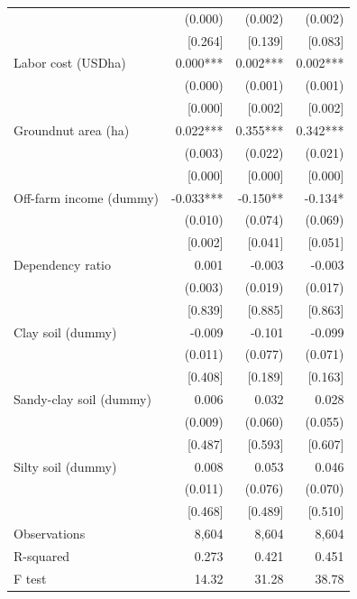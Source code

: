 \documentclass[
]{article}
\begin{document}
\begin{ThreePartTable}
\begin{longtable}[t]{lrrr}
 & (0.000) & (0.002) & (0.002)\\
 & {}[0.264] & {}[0.139] & {}[0.083]\\
Labor cost (USD\/ha) & 0.000*** & 0.002*** & 0.002***\\
 & (0.000) & (0.001) & (0.001)\\
 & {}[0.000] & {}[0.002] & {}[0.002]\\
Groundnut area (ha) & 0.022*** & 0.355*** & 0.342***\\
 & (0.003) & (0.022) & (0.021)\\
 & {}[0.000] & {}[0.000] & {}[0.000]\\
Off-farm income (dummy) & -0.033*** & -0.150** & -0.134*\\
 & (0.010) & (0.074) & (0.069)\\
 & {}[0.002] & {}[0.041] & {}[0.051]\\
Dependency ratio & 0.001 & -0.003 & -0.003\\
 & (0.003) & (0.019) & (0.017)\\
 & {}[0.839] & {}[0.885] & {}[0.863]\\
Clay soil (dummy) & -0.009 & -0.101 & -0.099\\
 & (0.011) & (0.077) & (0.071)\\
 & {}[0.408] & {}[0.189] & {}[0.163]\\
Sandy-clay soil (dummy) & 0.006 & 0.032 & 0.028\\
 & (0.009) & (0.060) & (0.055)\\
 & {}[0.487] & {}[0.593] & {}[0.607]\\
Silty soil (dummy) & 0.008 & 0.053 & 0.046\\
 & (0.011) & (0.076) & (0.070)\\
 & {}[0.468] & {}[0.489] & {}[0.510]\\
Observations & 8,604 & 8,604 & 8,604\\
R-squared & 0.273 & 0.421 & 0.451\\
F test & 14.32 & 31.28 & 38.78\\*
\end{longtable}
\end{ThreePartTable}
\endgroup{}

\newpage

\begingroup\fontsize{7}{9}\selectfont
\end{document}
